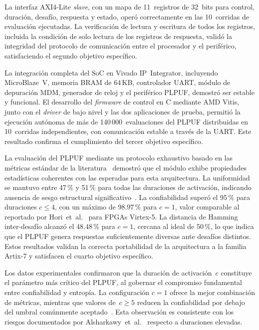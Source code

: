 La interfaz AXI4-Lite \textit{slave}, con un mapa de 11~registros de 32~bits
para control, duración, desafío, respuesta y estado, operó correctamente en
las 10~corridas de evaluación ejecutadas. La verificación de lectura y
escritura de todos los registros, incluida la condición de solo lectura de los
registros de respuesta, validó la integridad del protocolo de comunicación
entre el procesador y el periférico, satisfaciendo el segundo objetivo
específico.

La integración completa del SoC en Vivado IP~Integrator, incluyendo
MicroBlaze~V, memoria BRAM de 64\,KB, controlador UART, módulo de depuración
MDM, generador de reloj y el periférico PLPUF, demostró ser estable y
funcional. El desarrollo del \textit{firmware} de control en C mediante AMD
Vitis, junto con el \textit{driver} de bajo nivel y las dos aplicaciones de
prueba, permitió la ejecución autónoma de más de 140\,000~evaluaciones del
PLPUF distribuidas en 10~corridas independientes, con comunicación estable a
través de la UART. Este resultado confirma el cumplimiento del tercer
objetivo específico.

La evaluación del PLPUF mediante un protocolo exhaustivo basado en las
métricas estándar de la
literatura~\cite{hori_2011_pseudolfsr, maiti_2012_systematic} demostró que el
módulo exhibe propiedades estadísticas coherentes con las esperadas para esta
arquitectura. La uniformidad se mantuvo entre 47\,\% y 51\,\% para todas las
duraciones de activación, indicando ausencia de sesgo estructural
significativo~\cite{maiti_2012_systematic}. La confiabilidad superó el 95\,\%
para duraciones $c \leq 4$, con un máximo de 98.97\,\% para $c = 1$, valor
comparable al reportado por Hori~et~al.~\cite{hori_2011_pseudolfsr} para
FPGAs Virtex-5. La distancia de Hamming inter-desafío alcanzó el 48.48\,\%
para $c = 1$, cercana al ideal de 50\,\%, lo que indica que el PLPUF genera
respuestas suficientemente diversas ante desafíos distintos. Estos resultados
validan la correcta portabilidad de la arquitectura a la familia Artix-7 y
satisfacen el cuarto objetivo específico.

Los datos experimentales confirmaron que la duración de activación~$c$
constituye el parámetro más crítico del PLPUF, al gobernar el compromiso
fundamental entre confiabilidad y entropía. La configuración $c = 1$ ofrece la
mejor combinación de métricas, mientras que valores de~$c \geq 5$ reducen la
confiabilidad por debajo del umbral comúnmente
aceptado~\cite{maiti_2012_systematic}. Esta observación es consistente con los
riesgos documentados por Alsharkawy~et~al.~\cite{alsharkawy_2024_plpufs}
respecto a duraciones elevadas.

